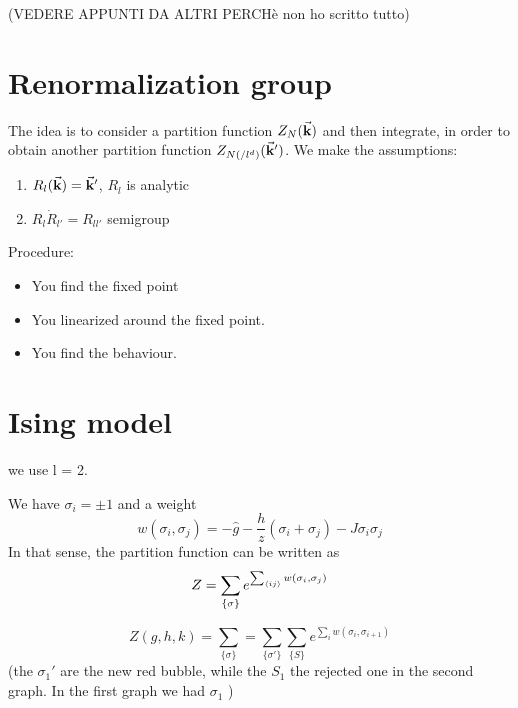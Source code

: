 \documentclass[../main/main.tex]{subfiles}
\begin{document}
(VEDERE APPUNTI DA ALTRI PERCHè non ho scritto tutto)

\section{Renormalization group}

The idea is to consider a partition function \( Z_N (\va{k}) \) and then integrate, in order to obtain another partition function \( Z_{N(/l^d)} (\va{k}') \).
We make the assumptions:
\begin{enumerate}
\item \( R_l (\va{k}) = \va{k}' \), \( R_l \) is analytic
\item  \( R_l \dot R_{l'}  = R_{l l'} \)   semigroup %
\end{enumerate}

Procedure:
\begin{itemize}
\item You find the fixed point
\item You linearized around the fixed point.
\item You find the behaviour.
\end{itemize}

\section{Ising model}
we use l = 2.

We have \( \sigma _i = \pm 1 \) and a weight
\begin{equation}
  w (\sigma _i, \sigma _j) = - \hat{g} - \frac{h}{z} (\sigma _i + \sigma _j) - J \sigma _i \sigma _j
\end{equation}
In that sense, the partition function can be written as
\begin{equation}
  Z = \sum_{\{ \sigma  \}  }^{}  e^{\sum_{\expval{ij} }^{} w (\sigma _i, \sigma _j)  }
\end{equation}

\begin{equation}
  Z (g, h, k) = \sum_{\{ \sigma  \}  }^{}   = \sum_{\{ \sigma ' \}  }^{}  \sum_{\{ S \}  }^{} e^{\sum_{i}^{} w (\sigma _i, \sigma _{i+1}) }
\end{equation}
(the \( \sigma _1' \) are the new red bubble, while the \( S_1 \) the rejected one in the second graph. In the first graph we had \( \sigma _1 \)  )
\end{document}
